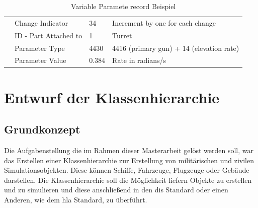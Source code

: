 \begin{table}[H]
{\begin{tabular}{|l|l|l|l|}
			& Change Indicator      & 34             & Increment by one for each change         \\ \cline{2-4} 
			& ID - Part Attached to & 1              & Turret                             \\ \cline{2-4} 
			& Parameter Type        & 4430           & 4416 (primary gun) + 14 (elevation rate) \\ \cline{2-4} 
			& Parameter Value       &0.384         & Rate in radians/s                        \\ \hline
	\end{tabular}}
	\caption[Variable Parameter record Beispiel ]{Variable Paramete record Beispiel\cite{SISOStandardsActivityCommitteeoftheIEEEComputerSociety.}}
	\label{variableex}
\end{table}


\chapter{Entwurf der Klassenhierarchie }


\section{Grundkonzept}
Die Aufgabenstellung die im Rahmen dieser Masterarbeit gelöst werden soll, war das Erstellen einer Klassenhierarchie zur Erstellung von militärischen und zivilen Simulationsobjekten. Diese können Schiffe, Fahrzeuge, Flugzeuge oder Gebäude darstellen. Die Klassenhierarchie soll die Möglichkeit liefern Objekte zu erstellen und zu simulieren und  diese anschließend in  den \ac{dis} Standard oder einen Anderen,  wie dem \ac{hla} Standard, zu überführt.   
 
